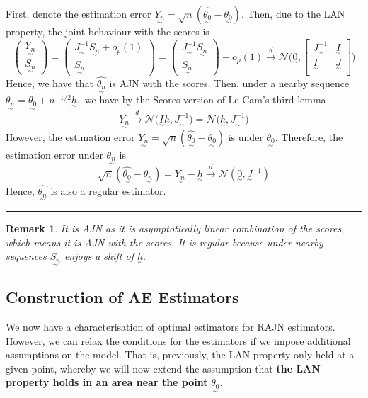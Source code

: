 \documentclass[twoside]{article}
\newtheorem{remark}[theorem]{Remark}
\newenvironment{proof}{{\bf Proof:}}{\hfill\rule{2mm}{2mm}}
\newcommand{\utilde}{\underset{\sim}}
\begin{document}
\begin{proof} First, denote the estimation error $\utilde{Y_n} = \sqrt{n}(\hat{\utilde{\theta_0}} - \utilde{\theta_0}).$ Then, due to the LAN property, the joint behaviour with the scores is 
$$
\begin{pmatrix}
\utilde{Y_n}\\
\utilde{S_n}
\end{pmatrix}
= 
\begin{pmatrix}
\utilde{J^{-1}}\utilde{S_n} + o_p(1)\\
\utilde{S_n}
\end{pmatrix} = 
\begin{pmatrix}
\utilde{J^{-1}}\utilde{S_n}\\
\utilde{S_n}
\end{pmatrix} + o_p(1) \xrightarrow{d} \mathcal{N}\bigg(\utilde{0}, \begin{bmatrix}
\utilde{J^{-1}} & \utilde{I}\\
\utilde{I} & \utilde{J}\\
\end{bmatrix} \bigg)
$$
Hence, we have that $\hat{\utilde{\theta_n}}$ is AJN with the scores. Then, under a nearby sequence $\utilde{\theta_n} = \utilde{\theta_0} + n^{-1/2}\utilde{h},$ we have by the Scores version of Le Cam's third lemma 
$$
\utilde{Y_n} \xrightarrow{d} \mathcal{N}\bigg(\utilde{I}\utilde{h}, \utilde{J^{-1}} \bigg) = \mathcal{N}\bigg(\utilde{h}, \utilde{J^{-1}} \bigg)
$$
However, the estimation error $\utilde{Y_n} = \sqrt{n}(\hat{\utilde{\theta_0}} - \utilde{\theta_0})$ is under $\utilde{\theta_0}.$ Therefore, the estimation error under $\utilde{\theta_n}$ is 
$$
\sqrt{n}(\hat{\utilde{\theta_0}} - \utilde{\theta_n}) = \utilde{Y_n} - \utilde{h} \xrightarrow{d} \mathcal{N}(\utilde{0}, \utilde{J}^{-1})
$$
Hence, $\hat{\utilde{\theta_n}}$ is also a regular estimator.
\end{proof}

\begin{remark}It is AJN as it is asymptotically linear combination of the scores, which means it is AJN with the scores. It is regular because under nearby sequences $\utilde{S_n}$ enjoys a shift of $\utilde{h}.$
\end{remark}

\subsection{Construction of AE Estimators}
We now have a characterisation of optimal estimators for RAJN estimators. However, we can relax the conditions for the estimators if we impose additional assumptions on the model. That is, previously, the LAN property only held at a given point, whereby we will now extend the assumption that \textbf{the LAN property holds in an area near the point} $\utilde{\theta_0}.$
\end{document}

